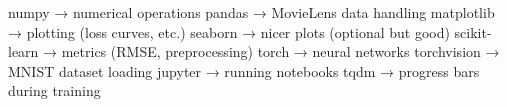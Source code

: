 numpy → numerical operations
pandas → MovieLens data handling
matplotlib → plotting (loss curves, etc.)
seaborn → nicer plots (optional but good)
scikit-learn → metrics (RMSE, preprocessing)
torch → neural networks
torchvision → MNIST dataset loading
jupyter → running notebooks
tqdm → progress bars during training